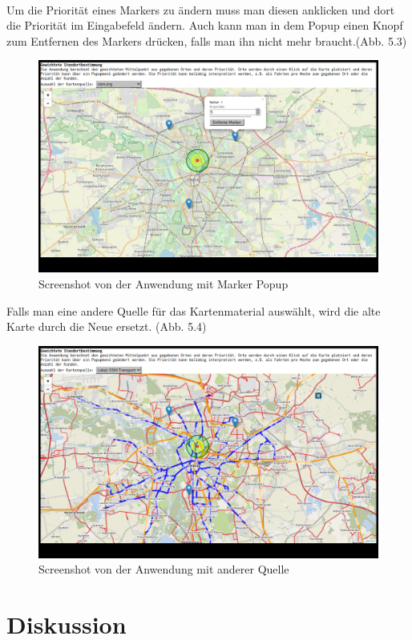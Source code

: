 \documentclass[a4paper, 12pt]{scrreprt}
\begin{document}
\\
Um die Priorität eines Markers zu ändern muss man diesen anklicken und dort die Priorität im Eingabefeld ändern. Auch kann man in dem Popup einen Knopf zum Entfernen des Markers drücken, falls man ihn nicht mehr braucht.(Abb. 5.3)\\
\begin{figure}[h]
\includegraphics[width=\linewidth]{bell3_1.png}\caption{Screenshot von der Anwendung mit Marker Popup}
\end{figure}
Falls man eine andere Quelle für das Kartenmaterial auswählt, wird die alte Karte durch die Neue ersetzt. (Abb. 5.4)
\begin{figure}
\includegraphics[width=\linewidth]{bell4_1.png}
\caption{Screenshot von der Anwendung mit anderer Quelle}
\end{figure}
\chapter{Diskussion}
\end{document}
